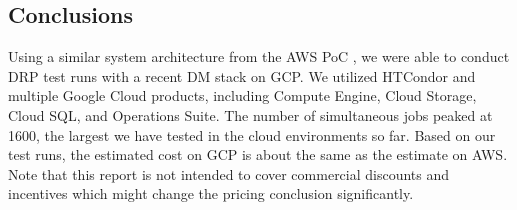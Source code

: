 \subsection{Conclusions}
Using a similar system architecture from the AWS PoC , we were able to conduct DRP test runs with a recent DM stack on GCP.
We utilized HTCondor and multiple Google Cloud products, including Compute Engine, Cloud Storage, Cloud SQL, and Operations Suite.
The number of simultaneous jobs peaked at 1600, the largest we have tested in the cloud environments so far.
Based on our test runs, the estimated cost on GCP is about the same as the estimate on AWS.
Note that this report is not intended to cover commercial discounts and incentives which might change the pricing conclusion significantly.
